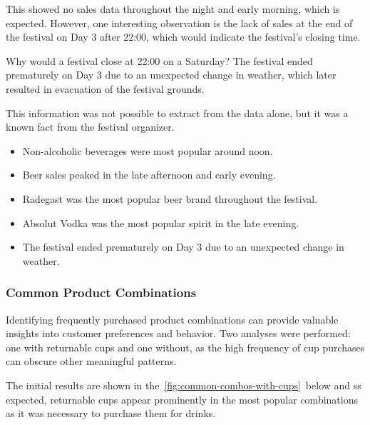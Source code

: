This showed no sales data throughout the night and early morning, which is expected.
However, one interesting observation is the lack of sales at the end of the festival on Day 3 after 22:00, which would indicate the festival's closing time.

\begin{infobox}{Why would a festival close at 22:00 on a Saturday?}
	The festival ended prematurely on Day 3 due to an unexpected change in weather, which later resulted in evacuation of the festival grounds.
\end{infobox}

This information was not possible to extract from the data alone, but it was a known fact from the festival organizer.

\begin{keytakeaways}
	\begin{itemize}
		\item Non-alcoholic beverages were most popular around noon.
		\item Beer sales peaked in the late afternoon and early evening.
		\item Radegast was the most popular beer brand throughout the festival.
		\item Absolut Vodka was the most popular spirit in the late evening.
		\item The festival ended prematurely on Day 3 due to an unexpected change in weather.
	\end{itemize}
\end{keytakeaways}


\subsubsection{Common Product Combinations}
\label{subsubsec:analysis-common-combinations}


Identifying frequently purchased product combinations can provide valuable insights into customer preferences and behavior.
Two analyses were performed: one with returnable cups and one without, as the high frequency of cup purchases can obscure other meaningful patterns.

The initial results are shown in the~\autoref{fig:common-combos-with-cups}~below and ss expected, returnable cups appear prominently in the most popular combinations as it was necessary to purchase them for drinks.

